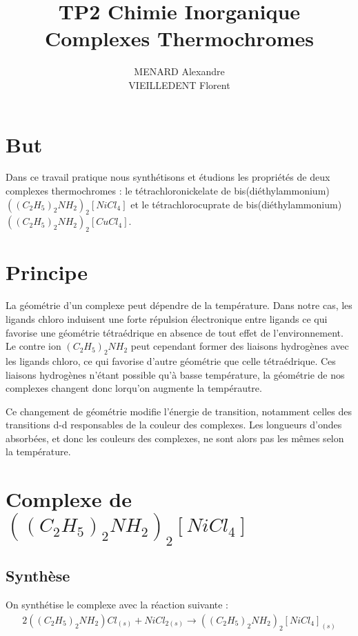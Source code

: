 \documentclass[12pt]{article}
\title{\textbf{TP2 Chimie Inorganique} \\ Complexes Thermochromes}
\author{MENARD Alexandre \\ VIEILLEDENT Florent}
\begin{document}
\maketitle

\section{But}
Dans ce travail pratique nous synthétisons et étudions les propriétés de deux complexes thermochromes : le tétrachloronickelate de bis(diéthylammonium) $((C_2H_5)_2NH_2)_2[NiCl_4]$ et le tétrachlorocuprate de bis(diéthylammonium) $((C_2H_5)_2NH_2)_2[CuCl_4]$.

\section{Principe}
La géométrie d'un complexe peut dépendre de la température. 
Dans notre cas, les ligands chloro induisent une forte répulsion électronique entre ligands ce qui favorise une géométrie tétraédrique en absence de tout effet de l'environnement.
Le contre ion $(C_2H_5)_2NH_2$ peut cependant former des liaisons hydrogènes avec les ligands chloro, ce qui favorise d'autre géométrie que celle tétraédrique.
Ces liaisons hydrogènes n'étant possible qu'à basse température, la géométrie de nos complexes changent donc lorqu'on augmente la tempérautre.

Ce changement de géométrie modifie l'énergie de transition, notamment celles des transitions d-d responsables de la couleur des complexes.
Les longueurs d'ondes absorbées, et donc les couleurs des complexes, ne sont alors pas les mêmes selon la température.

\newpage

\section{Complexe  de $((C_2H_5)_2NH_2)_2[NiCl_4]$}
\subsection{Synthèse}
On synthétise le complexe avec la réaction suivante :
\begin{align}
    2((C_2H_5)_2NH_2)Cl_{(s)} + NiCl_{2(s)} \longrightarrow ((C_2H_5)_2NH_2)_2[NiCl_4]_{(s)}
\label{eq1:Premiere synthese}
\end{align}
\end{document}
